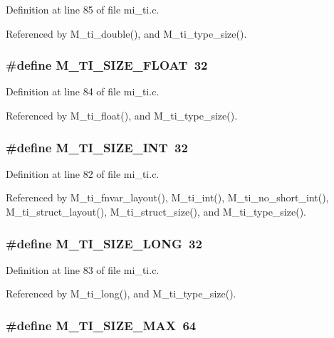 Definition at line 85 of file mi\_\-ti.c.

Referenced by M\_\-ti\_\-double(), and M\_\-ti\_\-type\_\-size().
\subsubsection{\setlength{\rightskip}{0pt plus 5cm}\#define M\_\-TI\_\-SIZE\_\-FLOAT~32}\label{mi__ti_8c_9c79d3d8ff2d83e401cafc66f77fb90c}




Definition at line 84 of file mi\_\-ti.c.

Referenced by M\_\-ti\_\-float(), and M\_\-ti\_\-type\_\-size().
\subsubsection{\setlength{\rightskip}{0pt plus 5cm}\#define M\_\-TI\_\-SIZE\_\-INT~32}\label{mi__ti_8c_3b1e0f3b322e6256389055a6496e8f33}




Definition at line 82 of file mi\_\-ti.c.

Referenced by M\_\-ti\_\-fnvar\_\-layout(), M\_\-ti\_\-int(), M\_\-ti\_\-no\_\-short\_\-int(), M\_\-ti\_\-struct\_\-layout(), M\_\-ti\_\-struct\_\-size(), and M\_\-ti\_\-type\_\-size().
\subsubsection{\setlength{\rightskip}{0pt plus 5cm}\#define M\_\-TI\_\-SIZE\_\-LONG~32}\label{mi__ti_8c_79974440324502dd6ed6697a2946bd00}




Definition at line 83 of file mi\_\-ti.c.

Referenced by M\_\-ti\_\-long(), and M\_\-ti\_\-type\_\-size().
\subsubsection{\setlength{\rightskip}{0pt plus 5cm}\#define M\_\-TI\_\-SIZE\_\-MAX~64}\label{mi__ti_8c_6ee3b6cbe840c0cce8cec512f6ebb436}




